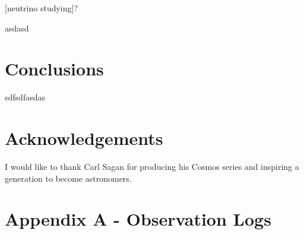 \documentclass[twocolumn]{revtex4}
\begin{document}
[neutrino studying]?

asdasd

\vspace{-5ex}
\section{Conclusions}
\vspace{-2ex}

sdfsdfasdas

\vspace{-5ex}
\section*{Acknowledgements}
\vspace{-2ex}

I would like to thank Carl Sagan for producing his Cosmos series and inspiring a generation to become astronomers.




\clearpage




\vfill
\twocolumngrid
\vspace{-3ex}
\section*{Appendix A - Observation Logs}
\vspace{-2ex}



\clearpage
\end{document}
